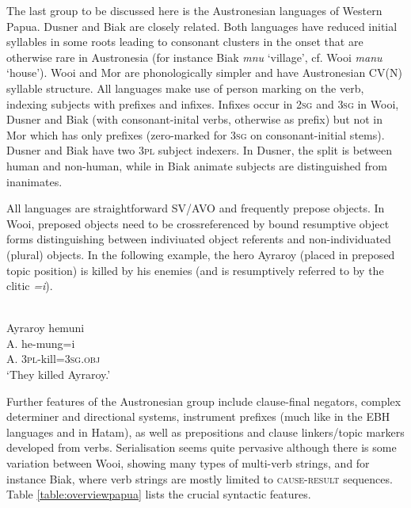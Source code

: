 The last group to be discussed here is the Austronesian languages of Western Papua. Dusner and Biak are closely related. Both languages have reduced initial syllables in some roots leading to consonant clusters in the onset that are otherwise rare in Austronesia (for instance Biak \textit{mnu} `village', cf. Wooi \textit{manu} `house'). Wooi and Mor are phonologically simpler and have Austronesian CV(N) syllable structure. All languages make use of person marking on the verb, indexing subjects with prefixes and infixes. Infixes occur in \textsc{2sg} and \textsc{3sg} in Wooi, Dusner and Biak (with consonant-inital verbs, otherwise as prefix) but not in Mor which has only prefixes (zero-marked for \textsc{3sg} on consonant-initial stems). Dusner and Biak have two \textsc{3pl} subject indexers. In Dusner, the split is between human and non-human, while in Biak animate subjects are distinguished from inanimates.

All languages are straightforward SV/AVO and frequently prepose objects. In Wooi, preposed objects need to be crossreferenced by bound resumptive object forms distinguishing between indiviuated object referents and non-individuated (plural) objects. In the following example, the hero Ayraroy (placed in preposed topic position) is killed by his enemies (and is resumptively referred to by the clitic \textit{=i}).

\ea 
{}\\
\glll Ayraroy hemuni \\
A. he-mung=i \\
A. \textsc{3}\textsc{pl}-kill=\textsc{3}\textsc{sg}.\textsc{obj} \\
\glft `They killed Ayraroy.'
\z

Further features of the Austronesian group include clause-final negators, complex determiner and directional systems, instrument prefixes (much like in the EBH languages and in Hatam), as well as prepositions and clause linkers/topic markers developed from verbs. Serialisation seems quite pervasive although there is some variation between Wooi, showing many types of multi-verb strings, and for instance Biak, where verb strings are mostly limited to \textsc{cause-result} sequences. Table \ref{table:overviewpapua} lists the crucial syntactic features.

